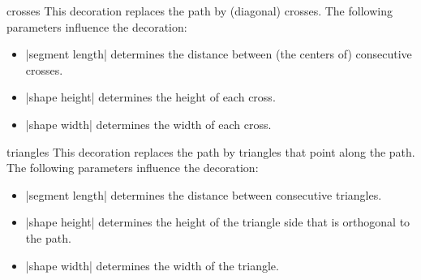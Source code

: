 \begin{decoration}{crosses}
    This decoration replaces the path by (diagonal) crosses. The following
    parameters influence the decoration:
    \begin{itemize}
        \item |segment length| determines the distance between (the centers of)
            consecutive crosses.
        \item |shape height| determines the height of each cross.
        \item |shape width| determines the width of each cross.
    \end{itemize}
\begin{codeexample}[]
\end{codeexample}
\end{decoration}

\begin{decoration}{triangles}
    This decoration replaces the path by triangles that point along the path.
    The following parameters influence the decoration:
    \begin{itemize}
        \item |segment length| determines the distance between consecutive
            triangles.
        \item |shape height| determines the height of the triangle side that is
            orthogonal to the path.
        \item |shape width| determines the width of the triangle.
    \end{itemize}
\begin{codeexample}[]
\end{codeexample}
\end{decoration}

